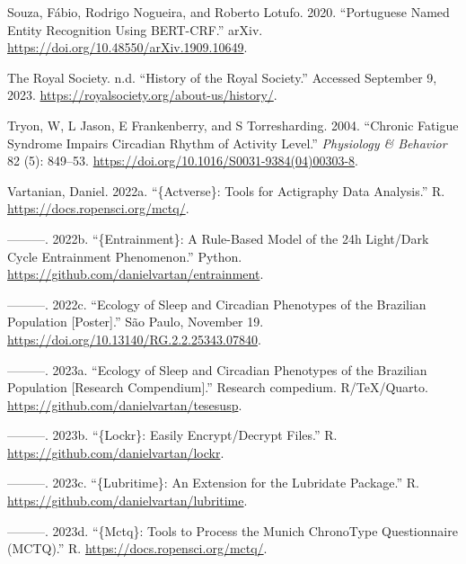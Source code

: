 \documentclass[
  12pt,
  a4paper,
  oneside]{tesesusp}
\newlength{\cslhangindent}
\newlength{\cslentryspacingunit} %
\newenvironment{CSLReferences}[2] %
 {%
  \setlength{\parindent}{0pt}
  \ifodd #1
  \let\oldpar\par
  \def\par{\hangindent=\cslhangindent\oldpar}
  \fi
  \setlength{\parskip}{#2\cslentryspacingunit}
 }%
 {}
\begin{document}
\begin{CSLReferences}{1}{0}
\leavevmode{}%
Souza, Fábio, Rodrigo Nogueira, and Roberto Lotufo. 2020. {``Portuguese
Named Entity Recognition Using BERT-CRF.''} arXiv.
\url{https://doi.org/10.48550/arXiv.1909.10649}.

\leavevmode{}%
The Royal Society. n.d. {``History of the Royal Society.''} Accessed
September 9, 2023. \url{https://royalsociety.org/about-us/history/}.

\leavevmode{}%
Tryon, W, L Jason, E Frankenberry, and S Torresharding. 2004. {``Chronic
Fatigue Syndrome Impairs Circadian Rhythm of Activity Level.''}
\emph{Physiology \& Behavior} 82 (5): 849--53.
\url{https://doi.org/10.1016/S0031-9384(04)00303-8}.

\leavevmode{}%
Vartanian, Daniel. 2022a. {``\{Actverse\}: Tools for Actigraphy Data
Analysis.''} R. \url{https://docs.ropensci.org/mctq/}.

\leavevmode{}%
---------. 2022b. {``\{Entrainment\}: A Rule-Based Model of the 24h
Light/Dark Cycle Entrainment Phenomenon.''} Python.
\url{https://github.com/danielvartan/entrainment}.

\leavevmode{}%
---------. 2022c. {``Ecology of Sleep and Circadian Phenotypes of the
Brazilian Population {[}Poster{]}.''} São Paulo, November 19.
\url{https://doi.org/10.13140/RG.2.2.25343.07840}.

\leavevmode{}%
---------. 2023a. {``Ecology of Sleep and Circadian Phenotypes of the
Brazilian Population {[}Research Compendium{]}.''} Research compedium.
R/TeX/Quarto. \url{https://github.com/danielvartan/tesesusp}.

\leavevmode{}%
---------. 2023b. {``\{Lockr\}: Easily Encrypt/Decrypt Files.''} R.
\url{https://github.com/danielvartan/lockr}.

\leavevmode{}%
---------. 2023c. {``\{Lubritime\}: An Extension for the Lubridate
Package.''} R. \url{https://github.com/danielvartan/lubritime}.

\leavevmode{}%
---------. 2023d. {``\{Mctq\}: Tools to Process the Munich ChronoType
Questionnaire (MCTQ).''} R. \url{https://docs.ropensci.org/mctq/}.


\end{CSLReferences}
\end{document}
